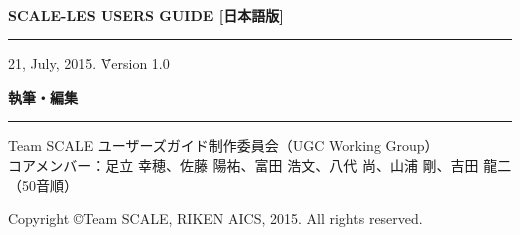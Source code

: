 \newpage
\thispagestyle{empty}

　\\

\vspace{10mm}
{\large{\bf SCALE-LES USERS GUIDE [日本語版]}}\\
\hrule width 90mm
\begin{tabbing} 
21, July, 2015.  \= \=  Version 1.0
\end{tabbing} 


\vspace{10mm}
{\large{\bf 執筆・編集}}\\
\hrule width 90mm
\begin{tabbing} 
Team SCALE ユーザーズガイド制作委員会（UGC Working Group）\\
コアメンバー：足立 幸穂、佐藤 陽祐、富田 浩文、八代 尚、山浦 剛、吉田 龍二（50音順）\\
\end{tabbing} 


\vspace{110mm}
\begin{flushright}

\vspace{10mm}
Copyright \copyright Team SCALE, RIKEN AICS, 2015. All rights reserved.
\end{flushright}

